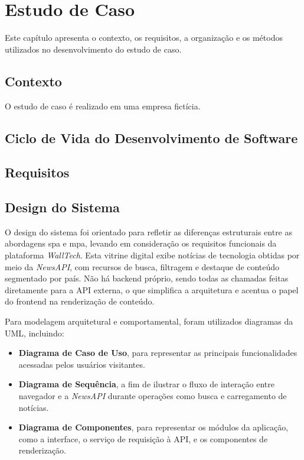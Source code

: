 \chapter{Estudo de Caso }
\label{cap:estudo_caso1}
Este capítulo apresenta o contexto, os requisitos, a organização e os métodos utilizados no desenvolvimento do estudo de caso.

\section{Contexto}
\label{section:contexto}
O estudo de caso é realizado em uma empresa fictícia.

\section{Ciclo de Vida do Desenvolvimento de Software}



\section{Requisitos}
\label{section:requisitos}

\section{Design do Sistema}
\label{cap:design}

O design do sistema foi orientado para refletir as diferenças estruturais entre as abordagens \acrshort{spa} e \acrshort{mpa}, levando em consideração os requisitos funcionais da plataforma \textit{WallTech}. Esta vitrine digital exibe notícias de tecnologia obtidas por meio da \textit{NewsAPI}, com recursos de busca, filtragem e destaque de conteúdo segmentado por país. Não há backend próprio, sendo todas as chamadas feitas diretamente para a API externa, o que simplifica a arquitetura e acentua o papel do frontend na renderização de conteúdo.

Para modelagem arquitetural e comportamental, foram utilizados diagramas da UML, incluindo:
\begin{itemize}
  \item \textbf{Diagrama de Caso de Uso}, para representar as principais funcionalidades acessadas pelos usuários visitantes.
  \item \textbf{Diagrama de Sequência}, a fim de ilustrar o fluxo de interação entre navegador e a \textit{NewsAPI} durante operações como busca e carregamento de notícias.
  \item \textbf{Diagrama de Componentes}, para representar os módulos da aplicação, como a interface, o serviço de requisição à API, e os componentes de renderização.
\end{itemize}

